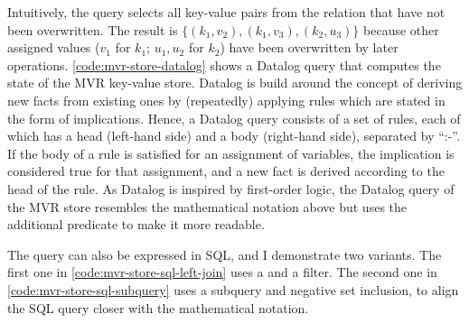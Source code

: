 Intuitively, the query selects all key-value pairs from the  relation
that have not been overwritten.
The result is \(\{ (k_1, v_2), (k_1, v_3), (k_2, u_3)\}\) because other assigned values
(\(v_1\) for \(k_1\); \(u_1, u_2\) for \(k_2\)) have been overwritten by later operations.
\ref{code:mvr-store-datalog} shows a Datalog query that computes the state of the
\ac{MVR} key-value store.
Datalog is build around the concept of deriving new facts from existing ones
by (repeatedly) applying rules which are stated in the form of implications.
Hence, a Datalog query consists of a set of rules, each of which has a
head (left-hand side) and a body (right-hand side), separated by ``:-''.
If the body of a rule is satisfied for an assignment of variables,
the implication is considered true for that assignment,
and a new fact is derived according to the head of the rule.
As Datalog is inspired by first-order logic, the Datalog query of the \ac{MVR}
store resembles the mathematical notation above but uses the
additional  predicate to make it more readable.

The query can also be expressed in SQL, and I demonstrate two variants.
The first one in \ref{code:mvr-store-sql-left-join} uses a 
and a  filter.
The second one in \ref{code:mvr-store-sql-subquery} uses a subquery
and negative set inclusion, to align the SQL query closer with the mathematical
notation.

